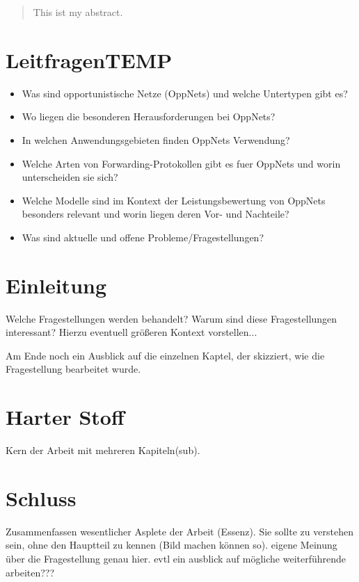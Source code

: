 \documentclass[a4paper, 12pt]{article}
\begin{document}


\tableofcontents

\begin{abstract}
	This ist my abstract.
\end{abstract}


\section{LeitfragenTEMP}
\begin{itemize}
	\item Was sind opportunistische Netze (OppNets) und welche Untertypen gibt es?
	\item Wo liegen die besonderen Herausforderungen bei OppNets?
	\item In welchen Anwendungsgebieten finden OppNets Verwendung?
	\item Welche Arten von Forwarding-Protokollen gibt es fuer OppNets und worin unterscheiden sie sich?
	\item Welche Modelle sind im Kontext der Leistungsbewertung von OppNets besonders relevant und worin liegen deren Vor- und Nachteile?
	\item Was sind aktuelle und offene Probleme/Fragestellungen?
\end{itemize}

\section{Einleitung}
Welche Fragestellungen werden behandelt?
Warum sind diese Fragestellungen interessant? Hierzu eventuell größeren Kontext vorstellen...

Am Ende noch ein Ausblick auf die einzelnen Kaptel, der skizziert, wie die Fragestellung bearbeitet wurde.


\section{Harter Stoff}
Kern der Arbeit mit mehreren Kapiteln(sub). 



\section{Schluss}
Zusammenfassen wesentlicher Asplete der Arbeit (Essenz).
Sie sollte zu verstehen sein, ohne den Hauptteil zu kennen (Bild machen können so).
eigene Meinung über die Fragestellung genau hier.
evtl ein ausblick auf mögliche weiterführende arbeiten???




\end{document}
